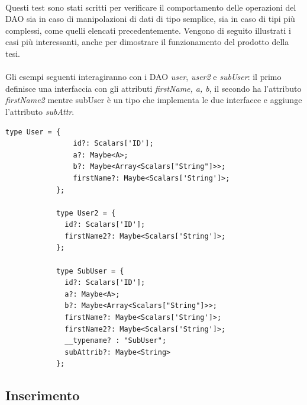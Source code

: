 \documentclass[a4paper, 12pt]{report}
\begin{document}
        \paragraph*{}
          Questi test sono stati scritti per verificare il comportamento delle operazioni del DAO sia in caso di manipolazioni di dati di tipo semplice, sia in caso di tipi più complessi, come quelli elencati precedentemente.
          Vengono di seguito illustrati i casi più interessanti, anche per dimostrare il funzionamento del prodotto della tesi.
          \paragraph*{}
          Gli esempi seguenti interagiranno con i DAO \emph{user}, \emph{user2} e \emph{subUser}: il primo definisce una interfaccia con gli attributi \emph{firstName, a, b}, il secondo ha l'attributo \emph{firstName2} mentre subUser è un tipo che implementa le due interfacce e aggiunge l'attributo \emph{subAttr}.
          \begin{Verbatim}[samepage=true]
            type User = {
                id?: Scalars['ID'];
                a?: Maybe<A>;
                b?: Maybe<Array<Scalars["String"]>>;
                firstName?: Maybe<Scalars['String']>;
            };
            
            type User2 = {
              id?: Scalars['ID'];
              firstName2?: Maybe<Scalars['String']>;
            };
            
            type SubUser = {
              id?: Scalars['ID'];
              a?: Maybe<A>;
              b?: Maybe<Array<Scalars["String"]>>;
              firstName?: Maybe<Scalars['String']>;
              firstName2?: Maybe<Scalars['String']>;
              __typename? : "SubUser";
              subAttrib?: Maybe<String>
            };

          \end{Verbatim}
        \newpage
        \subsection{Inserimento}
\end{document}
